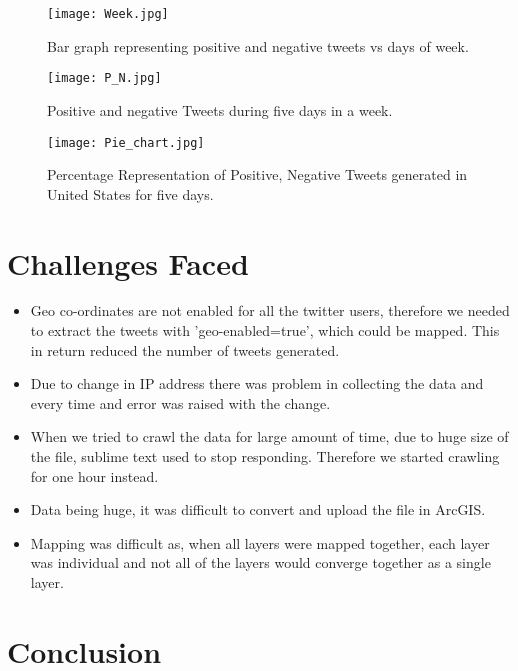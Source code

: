 \documentclass[12pt, oneside]{article}   	%
\begin{document}
\begin{figure}[!htb]
	\centering
	\texttt{[image: Week.jpg]}\\
	\caption{ Bar graph representing positive and negative tweets vs days of week.}
\end{figure}

\begin{figure}[!htb]
	\centering
	\texttt{[image: P\_N.jpg]}\\
	\caption{ Positive  and negative Tweets during five days in a week.}
\end{figure}

\begin{figure}[!htb]
	\centering
	\texttt{[image: Pie\_chart.jpg]}\\
	\caption{ Percentage Representation of Positive, Negative Tweets generated in United States for five days.}
\end{figure}


\section{Challenges Faced}
\begin{itemize}
	\item Geo co-ordinates are not enabled for all the twitter users, therefore we needed to extract the tweets with 'geo-enabled=true', which could be mapped. This in return reduced the number of tweets generated.
	\item Due to change in IP address there was problem in collecting the data and every time and error was raised with the change.
	\item When we tried to crawl the data for large amount of time, due to huge size of the file, sublime text used to stop responding. Therefore we started crawling for one hour instead. 
	\item Data being huge, it was difficult to convert and upload the file in ArcGIS.
	\item Mapping was difficult as,  when all layers were mapped together, each layer was individual and not all of the layers would converge together as a single layer.

\end{itemize}

\section{Conclusion}
\end{document}
